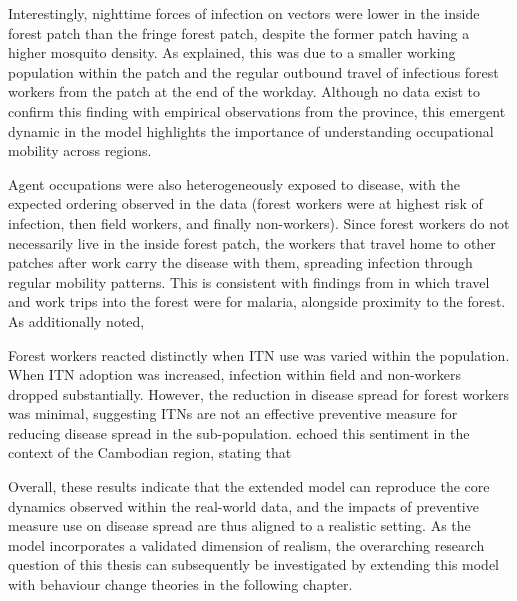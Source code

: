 Interestingly, nighttime forces of infection on vectors were lower in the inside forest patch than the fringe forest patch, despite the former patch having a higher mosquito density. As explained, this was due to a smaller working population within the patch and the regular outbound travel of infectious forest workers from the patch at the end of the workday. Although no data exist to confirm this finding with empirical observations from the province, this emergent dynamic in the model highlights the importance of understanding occupational mobility across regions.

Agent occupations were also heterogeneously exposed to disease, with the expected ordering observed in the data (forest workers were at highest risk of infection, then field workers, and finally non-workers). Since forest workers do not necessarily live in the inside forest patch, the workers that travel home to other patches after work carry the disease with them, spreading infection through regular mobility patterns. This is consistent with findings from \citet{sandfort_forest_2020} in which travel and work trips into the forest were  for malaria, alongside proximity to the forest. As \citet{sandfort_forest_2020} additionally noted, 

Forest workers reacted distinctly when ITN use was varied within the population. When ITN adoption was increased, infection within field and non-workers dropped substantially. However, the reduction in disease spread for forest workers was minimal, suggesting ITNs are not an effective preventive measure for reducing disease spread in the sub-population. \citet{sandfort_forest_2020} echoed this sentiment in the context of the Cambodian region, stating that 

Overall, these results indicate that the extended model can reproduce the core dynamics observed within the real-world data, and the impacts of preventive measure use on disease spread are thus aligned to a realistic setting. As the model incorporates a validated dimension of realism, the overarching research question of this thesis can subsequently be investigated by extending this model with behaviour change theories in the following chapter.


